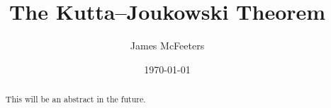 \documentclass[letterpaper, twoside, 12 pt]{article}
\title{The Kutta--Joukowski Theorem}
\date{\today}
\author{James McFeeters}
\begin{document}
	\maketitle

\begin{abstract}
	This will be an abstract in the future. 
\end{abstract}


\clearpage
\nocite{*}


\end{document}
